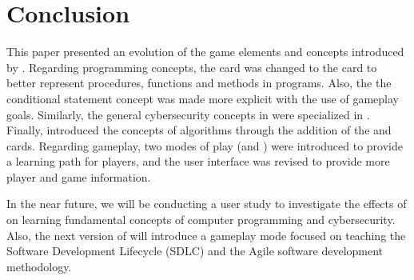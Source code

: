 \section{Conclusion}
This paper presented an evolution of the game elements and concepts introduced by \pwOne \cite{anvikPW}. Regarding programming concepts, the \Gr card was changed to the \M card to better represent procedures, functions and methods in programs. Also, the the conditional statement concept was made more explicit with the use of gameplay goals. Similarly, the general cybersecurity concepts in \pwOne were specialized in \pwTwoNS. Finally, \pwTwo introduced the concepts of algorithms through the addition of the \Ser and \Sort cards. Regarding gameplay, two modes of play (\B and \StdNS) were introduced to provide a learning path for players, and the user interface was revised to provide more player and game information.  

In the near future, we will be conducting a user study to investigate the effects of \pwTwo on learning fundamental concepts of computer programming and cybersecurity. Also, the next version of \gameName will introduce a gameplay mode focused on teaching the Software Development Lifecycle (SDLC) and the Agile software development methodology. 